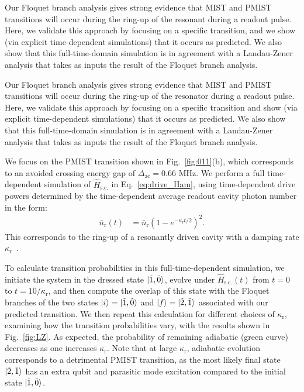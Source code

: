 \documentclass[%
reprint,
superscriptaddress,
 amsmath,amssymb,
 aps,
 prx,
longbibliography,
floatfix,
]{revtex4-2}
\begin{document}
Our Floquet branch analysis gives strong evidence that MIST and PMIST transitions will occur during the ring-up of the resonant during a readout pulse.  Here, we validate this approach by focusing on a specific transition, and we show (via explicit time-dependent simulations) that it occurs as predicted.  We also show that this full-time-domain simulation is in agreement with a Landau-Zener analysis that takes as inputs the result of the Floquet branch analysis.    

Our Floquet branch analysis gives strong evidence that MIST and PMIST transitions will occur during the ring-up of the resonator during a readout pulse. Here, we validate this approach by focusing on a specific transition and show (via explicit time-dependent simulations) that it occurs as predicted. We also show that this full-time-domain simulation is in agreement with a Landau-Zener analysis that takes as inputs the result of the Floquet branch analysis.

We focus on the PMIST transition shown in Fig.~\ref{fig:011}(b), which corresponds to an avoided crossing energy gap of $\Delta_\textrm{ac}=0.66$ MHz. We perform a full time-dependent simulation of $\hat H_\textrm{s.c.}$ in Eq.~\ref{eq:drive_Ham}, using time-dependent drive powers determined by the time-dependent average readout cavity photon number in the form:
\begin{align}
    \bar n_\textrm{r}(t)&=\bar n_\textrm{r}(1-e^{-\kappa_\textrm{r} t/2})^2.\label{eq:LZ-n}
\end{align}
This corresponds to the ring-up of a resonantly driven cavity with a damping rate $\kappa_\textrm{r}$~\cite{khezri2023measurement,dumas2024unified,cohen2023reminiscence}.

To calculate transition probabilities in this full-time-dependent simulation, we initiate the system in the dressed state $\ket{\tilde{1},\tilde{0}}$, evolve under $\hat{H}_\textrm{s.c.}(t)$ from $t=0$ to $t=10 / \kappa_\textrm{r}$, and then compute the overlap of this state with the Floquet branches of the two states $\ket{i}=\ket{\tilde{1},\tilde{0}}$ and $\ket{f}=\ket{\tilde{2},\tilde{1}}$ associated with our predicted transition. We then repeat this calculation for different choices of $\kappa_\textrm{r}$, examining how the transition probabilities vary, with the results shown in Fig.~\ref{fig:LZ}. As expected, the probability of remaining adiabatic (green curve) decreases as one increases $\kappa_\textrm{r}$. Note that at large $\kappa_\textrm{r}$, adiabatic evolution corresponds to a detrimental PMIST transition, as the most likely final state $\ket{\tilde{2}, \tilde{1}}$ has an extra qubit and parasitic mode excitation compared to the initial state $\ket{\tilde{1}, \tilde{0}}$.
\end{document}
